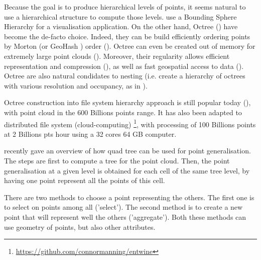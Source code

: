 	
	Because the goal is to produce hierarchical levels of points, it seems natural to use a hierarchical structure to compute those levels.
	\cite{Rusinkiewicz2000} use a Bounding Sphere Hierarchy for a visualisation application.
	On the other hand, Octree (\cite{Meagher1982}) have become the de-facto choice.
	Indeed, they can be build efficiently ordering points by Morton (or GeoHash \cite{Sabo2014}) order (\cite{Feng2014}).
	Octree can even be created out of memory for extremely large point clouds (\cite{Baert2014}). 
	Moreover, their regularity allows efficient representation and compression (\cite{Schnabel2006,Huang2006}), as well as fast geospatial access to data (\cite{Elseberg2013}).
	Octree are also natural condidates to nesting (i.e. create a hierarchy of octrees with various resolution and occupancy, as in \cite{Hornung2013}). 


    	Octree construction into file system hierarchy approach is still popular today (\cite{OscarMartinez-Rubi2015}), with point cloud in the 600 Billions points range.
	It has also been adapted to distributed file system (cloud-computing)  \footnote{\url{https://github.com/connormanning/entwine}}, with processing of 100 Billions points at 2 Billions pts \per hour using a 32 cores 64 GB computer.

	
	
	\cite{Bereuter2015} recently gave an overview of how quad tree can be used for point generalisation.
	The steps are first to compute a tree for the point cloud.
	Then, the point generalisation at a given level is obtained for each cell of the same tree level, by having one point represent all the points of this cell.
	
	There are two methods to choose a point representing the others. The first one is to select on points among all ('select').
	The second method is to create a new point that will represent well the others ('aggregate'). 
	Both these methods can use geometry of points, but also other attributes.
	
